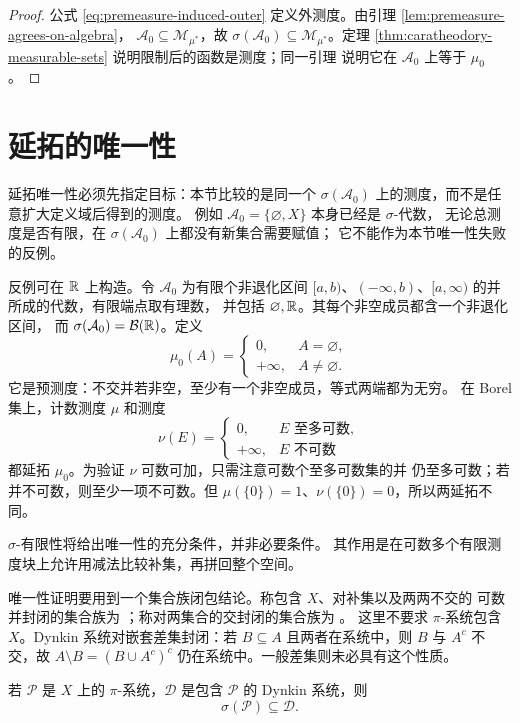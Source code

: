 \begin{proof}
公式 \eqref{eq:premeasure-induced-outer} 定义外测度。由引理
\ref{lem:premeasure-agrees-on-algebra}，
$\mathcal A_0\subseteq\mathcal M_{\mu^*}$，故
$\sigma(\mathcal A_0)\subseteq\mathcal M_{\mu^*}$。定理
\ref{thm:caratheodory-measurable-sets} 说明限制后的函数是测度；同一引理
说明它在 $\mathcal A_0$ 上等于 $\mu_0$。
\end{proof}

\section{延拓的唯一性}

延拓唯一性必须先指定目标：本节比较的是同一个
$\sigma(\mathcal A_0)$ 上的测度，而不是任意扩大定义域后得到的测度。
例如 $\mathcal A_0=\{\varnothing,X\}$ 本身已经是 $\sigma$-代数，
无论总测度是否有限，在 $\sigma(\mathcal A_0)$ 上都没有新集合需要赋值；
它不能作为本节唯一性失败的反例。

反例可在 $\mathbb{R}$ 上构造。令 $\mathcal A_0$ 为有限个非退化区间
$[a,b)$、$(-\infty,b)$、$[a,\infty)$ 的并所成的代数，有限端点取有理数，
并包括 $\varnothing,\mathbb{R}$。其每个非空成员都含一个非退化区间，
而 $\sigma(\mathcal A_0)=\mathcal B(\mathbb{R})$。定义
\[
 \mu_0(A)=
 \begin{cases}0,&A=\varnothing,\\+\infty,&A\ne\varnothing.\end{cases}
\]
它是预测度：不交并若非空，至少有一个非空成员，等式两端都为无穷。
在 Borel 集上，计数测度 $\mu$ 和测度
\[
 \nu(E)=
 \begin{cases}0,&E\text{ 至多可数},\\+\infty,&E\text{ 不可数}\end{cases}
\]
都延拓 $\mu_0$。为验证 $\nu$ 可数可加，只需注意可数个至多可数集的并
仍至多可数；若并不可数，则至少一项不可数。但
$\mu(\{0\})=1$、$\nu(\{0\})=0$，所以两延拓不同。

$\sigma$-有限性将给出唯一性的充分条件，并非必要条件。
其作用是在可数多个有限测度块上允许用减法比较补集，再拼回整个空间。

唯一性证明要用到一个集合族闭包结论。称包含 $X$、对补集以及两两不交的
可数并封闭的集合族为 ；称对两集合的交封闭的集合族为
。
这里不要求 $\pi$-系统包含 $X$。Dynkin 系统对嵌套差集封闭：若
$B\subseteq A$ 且两者在系统中，则 $B$ 与 $A^c$ 不交，故
$A\setminus B=(B\cup A^c)^c$ 仍在系统中。一般差集则未必具有这个性质。

\begin{lemma}[$\pi$--$\lambda$ 定理]
\label{lem:pi-lambda}
若 $\mathcal P$ 是 $X$ 上的 $\pi$-系统，$\mathcal D$ 是包含
$\mathcal P$ 的 Dynkin 系统，则
\[
 \sigma(\mathcal P)\subseteq\mathcal D.
\]
\end{lemma}

